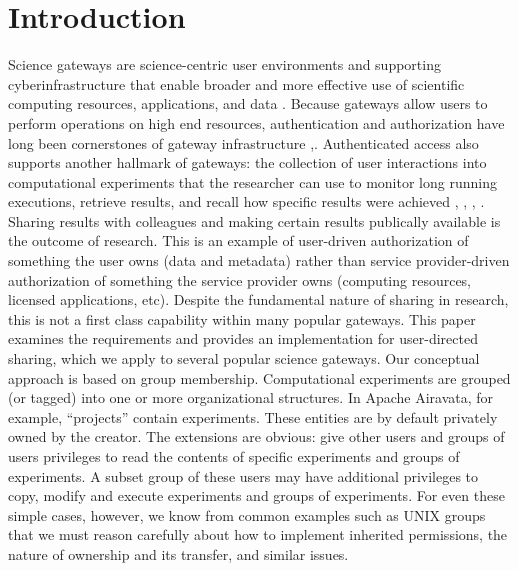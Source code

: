 \documentclass[sigconf]{acmart}
\begin{document}


\maketitle

\section{Introduction}

Science gateways are science-centric user environments and supporting cyberinfrastructure that enable broader and more effective use of scientific computing resources, applications, and data \cite{gatewaySurvey2015}. Because gateways allow users to perform operations on high end resources, authentication and authorization have long been cornerstones of gateway infrastructure \cite{airavataSecurity2016},\cite{welch2007aaaa}. Authenticated access also supports another hallmark of gateways: the collection of user interactions into computational experiments that the researcher can use to monitor long running executions, retrieve results, and recall how specific results were achieved \cite{cipres2010}, \cite{seagridCommunity2016}, \cite{ultrascanAiravata2014}, \cite{nsg2013}. 
Sharing results with colleagues and making certain results publically available is the outcome of research. This is an example of user-driven authorization of something the user owns (data and metadata) rather than service provider-driven authorization of something the service provider owns (computing resources, licensed applications, etc).  Despite the fundamental nature of sharing in research, this is not a first class capability within many popular gateways. This paper examines the requirements and provides an implementation for user-directed sharing, which we apply to several popular science gateways. 
Our conceptual approach is based on group membership. Computational experiments are grouped (or tagged) into one or more organizational structures. In Apache Airavata, for example, “projects” contain experiments. These entities are by default privately owned by the creator.  The extensions are obvious: give other users and groups of users privileges to read the contents of specific experiments and groups of experiments. A subset group of these users may have additional privileges to copy, modify and execute experiments and groups of experiments. For even these simple cases, however, we know from common examples such as UNIX groups that we must reason carefully about how to implement inherited permissions, the nature of ownership and its transfer, and similar issues.
\end{document}
